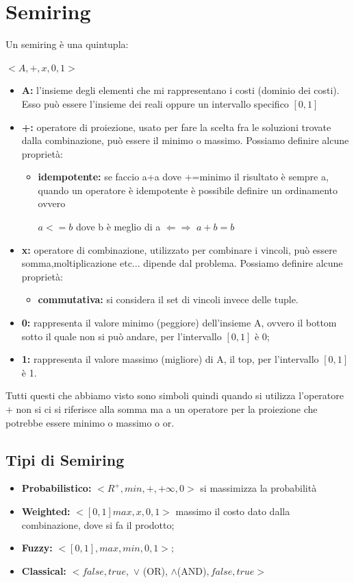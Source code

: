 \section{Semiring}
Un semiring è una quintupla:
\begin{center}
    $<A, +, x, 0, 1>$
\end{center}
\begin{itemize}
    \item \textbf{A:} l’insieme degli elementi che mi rappresentano i costi (dominio dei costi). Esso può essere l’insieme dei reali oppure un intervallo specifico $[0,1]$
    \item \textbf{+:} operatore di proiezione, usato per fare la scelta fra le soluzioni trovate dalla combinazione, può essere il minimo o massimo. Possiamo definire alcune proprietà:
    \begin{itemize}
        \item \textbf{idempotente:} se faccio a+a dove +=minimo il risultato è sempre a, quando un operatore è idempotente è possibile definire un ordinamento ovvero
        \begin{center}
            $a <= b$ dove b è meglio di a $\Leftarrow \Rightarrow$ $a + b = b$
        \end{center}
    \end{itemize}
    \item \textbf{x:} operatore di combinazione, utilizzato per combinare i vincoli, può essere somma,moltiplicazione etc... dipende dal problema. Possiamo definire alcune proprietà:
    \begin{itemize}
        \item \textbf{commutativa:} si considera il set di vincoli invece delle tuple.
    \end{itemize}
    \item \textbf{0:} rappresenta il valore minimo (peggiore) dell’insieme A, ovvero il bottom sotto il quale non si può andare, per l’intervallo $[0,1]$ è 0;
    \item \textbf{1:} rappresenta il valore massimo (migliore) di A, il top, per l’intervallo $[0,1]$ è 1.
\end{itemize}
Tutti questi che abbiamo visto sono simboli quindi quando si utilizza l’operatore $+$ non si ci si riferisce alla somma ma a un operatore per la proiezione che potrebbe essere minimo o massimo o or.
\subsection{Tipi di Semiring}
\begin{itemize}
    \item \textbf{Probabilistico:} $< R^+ , min, +, +\infty, 0>$ si massimizza la probabilità
    \item \textbf{Weighted:} $<[0, 1] max,x,0,1>$ massimo il costo dato dalla combinazione, dove si fa il prodotto;
    \item \textbf{Fuzzy:} $<[0,1],max,min,0,1>;$
    \item \textbf{Classical:} $<{false,true},$ $\lor$ (OR), $\land$(AND)$, false, true>$
\end{itemize}

